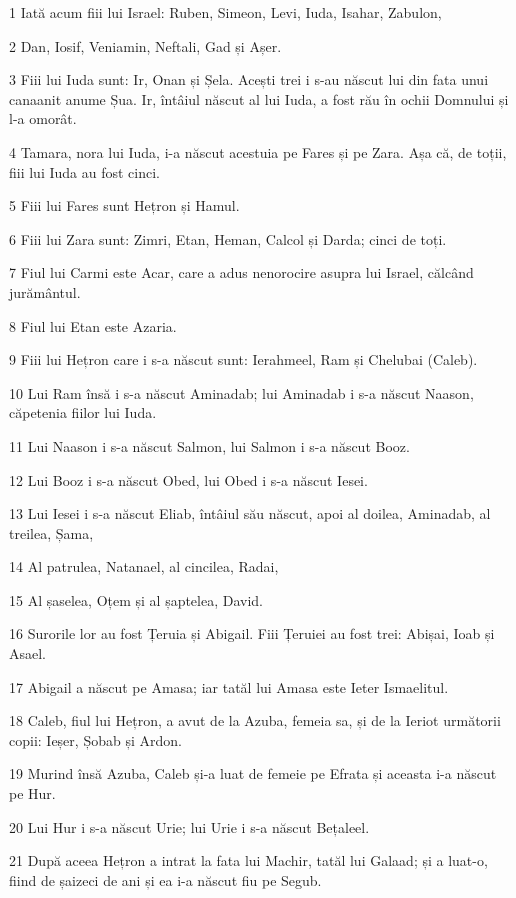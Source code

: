 \par 1 Iată acum fiii lui Israel: Ruben, Simeon, Levi, Iuda, Isahar, Zabulon,
\par 2 Dan, Iosif, Veniamin, Neftali, Gad și Așer.
\par 3 Fiii lui Iuda sunt: Ir, Onan și Șela. Acești trei i s-au născut lui din fata unui canaanit anume Șua. Ir, întâiul născut al lui Iuda, a fost rău în ochii Domnului și l-a omorât.
\par 4 Tamara, nora lui Iuda, i-a născut acestuia pe Fares și pe Zara. Așa că, de toții, fiii lui Iuda au fost cinci.
\par 5 Fiii lui Fares sunt Hețron și Hamul.
\par 6 Fiii lui Zara sunt: Zimri, Etan, Heman, Calcol și Darda; cinci de toți.
\par 7 Fiul lui Carmi este Acar, care a adus nenorocire asupra lui Israel, călcând jurământul.
\par 8 Fiul lui Etan este Azaria.
\par 9 Fiii lui Hețron care i s-a născut sunt: Ierahmeel, Ram și Chelubai (Caleb).
\par 10 Lui Ram însă i s-a născut Aminadab; lui Aminadab i s-a născut Naason, căpetenia fiilor lui Iuda.
\par 11 Lui Naason i s-a născut Salmon, lui Salmon i s-a născut Booz.
\par 12 Lui Booz i s-a născut Obed, lui Obed i s-a născut Iesei.
\par 13 Lui Iesei i s-a născut Eliab, întâiul său născut, apoi al doilea, Aminadab, al treilea, Șama,
\par 14 Al patrulea, Natanael, al cincilea, Radai,
\par 15 Al șaselea, Oțem și al șaptelea, David.
\par 16 Surorile lor au fost Țeruia și Abigail. Fiii Țeruiei au fost trei: Abișai, Ioab și Asael.
\par 17 Abigail a născut pe Amasa; iar tatăl lui Amasa este Ieter Ismaelitul.
\par 18 Caleb, fiul lui Hețron, a avut de la Azuba, femeia sa, și de la Ieriot următorii copii: Ieșer, Șobab și Ardon.
\par 19 Murind însă Azuba, Caleb și-a luat de femeie pe Efrata și aceasta i-a născut pe Hur.
\par 20 Lui Hur i s-a născut Urie; lui Urie i s-a născut Bețaleel.
\par 21 După aceea Hețron a intrat la fata lui Machir, tatăl lui Galaad; și a luat-o, fiind de șaizeci de ani și ea i-a născut fiu pe Segub.
